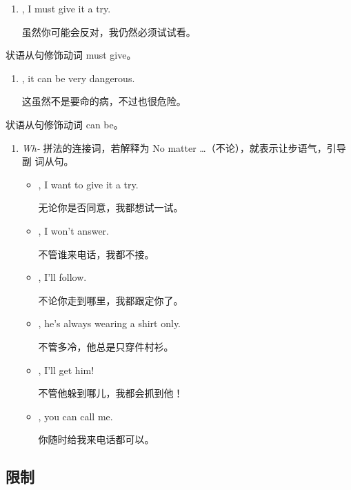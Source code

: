 \begin{enumerate}
\item {} , I must give it a
  try.

  虽然你可能会反对，我仍然必须试试看。
\end{enumerate}
状语从句修饰动词 must give。

\begin{enumerate}[resume]
\item {} , it can be
  very dangerous.

  这虽然不是要命的病，不过也很危险。
\end{enumerate}
状语从句修饰动词 can be。

\begin{enumerate}[resume]
\item \emph{Wh-} 拼法的连接词，若解释为 No matter \ldots（不论），就表示让步语气，引导副
  词从句。

\begin{itemize}
\item {} , I want
  to give it a try.

  无论你是否同意，我都想试一试。
\item {}, I won't answer.

  不管谁来电话，我都不接。
\item {}, I'll
  follow.

  不论你走到哪里，我都跟定你了。
\item {}, he's always
  wearing a shirt only.

  不管多冷，他总是只穿件村衫。
\item {}, I'll get
  him!

  不管他躲到哪儿，我都会抓到他！
\item {}, you can call me.

  你随时给我来电话都可以。
\end{itemize}
\end{enumerate}


\subsection{限制}

